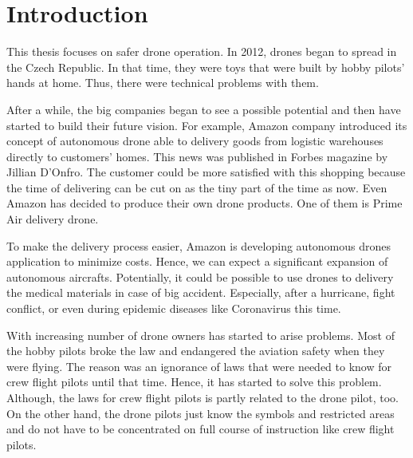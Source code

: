 \chapter{Introduction}\label{ch:introduction}
This thesis focuses on safer drone operation.%
In 2012, drones began to spread in the Czech Republic.
In that time, they were toys that were built by hobby pilots' hands at home.%
Thus, there were technical problems with them.%

After a while, the big companies began to see a possible potential and then have started to build their future vision.%
For example, Amazon company introduced its concept of autonomous drone able to delivery goods from logistic warehouses directly to customers' homes.%
This news was published in Forbes magazine by Jillian D'Onfro.\cite{amazonArticle}
The customer could be more satisfied with this shopping because the time of delivering can be cut on as the tiny part of the time as now.
Even Amazon has decided to produce their own drone products.
One of them is Prime Air delivery drone.

To make the delivery process easier, Amazon is developing autonomous drones application to minimize costs.
Hence, we can expect a significant expansion of autonomous aircrafts.
Potentially, it could be possible to use drones to delivery the medical materials in case of big accident.
Especially, after a hurricane, fight conflict, or even during epidemic diseases like Coronavirus this time.

With increasing number of drone owners has started to arise problems. %
Most of the hobby pilots broke the law and endangered the aviation safety when they were flying. %
The reason was an ignorance of laws that were needed to know for crew flight pilots until that time. %
Hence, it has started to solve this problem. %
Although, the laws for crew flight pilots is partly related to the drone pilot, too. %
On the other hand, the drone pilots just know the symbols and restricted areas and do not have to be concentrated on full course of instruction like crew flight pilots.

